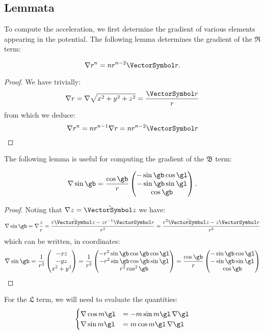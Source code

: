 \documentclass[10pt, a4paper, twoside]{basestyle}
\begin{document}
\subsection*{Lemmata}
To compute the acceleration, we first determine the gradient of various elements appearing in the potential.  The following lemma determines the gradient of the $\mathfrak R$ term:
\begin{lemma}
\[
\grad r^n = n r^{n - 2} \vr\text.
\]
\begin{proof}
We have trivially:
\[
\grad r = \grad \sqrt{x^2 + y^2 + z^2} = \frac{\vr}{r}
\]
from which we deduce:
\[
\grad r^n = n r^{n - 1} \grad r = n r^{n - 2} \vr
\]
\end{proof}
\end{lemma}
The following lemma is useful for computing the gradient of the $\mathfrak B$ term:
\begin{lemma}
\[
\grad \sin \gb =\frac{\cos \gb}{r}\begin{pmatrix}
-\sin \gb \cos \gl \\
-\sin \gb \sin \gl \\
\cos \gb
\end{pmatrix}\text.
\]
\begin{proof}
Noting that $\grad z = \hat{\vz}$ we have:
\[
\grad \sin \gb = \grad \frac{z}{r}
= \frac{r \hat{\vz} - z r^{-1} \vr}{r^2} = \frac{r^2 \hat{\vz} - z \vr}{r^3}
\]
which can be written, in coordinates:
\[
\grad \sin \gb =\frac{1}{r^3}\begin{pmatrix}
-x z \\ -y z \\ x^2 + y^2
\end{pmatrix}
=\frac{1}{r^3}\begin{pmatrix}
-r^2 \sin \gb \cos \gb \cos \gl \\
-r^2 \sin \gb \cos \gb \sin \gl \\
r^2 \cos^2 \gb
\end{pmatrix}
=\frac{\cos \gb}{r}\begin{pmatrix}
-\sin \gb \cos \gl \\
-\sin \gb \sin \gl \\
\cos \gb
\end{pmatrix}
\]
\end{proof}
\end{lemma}
For the $\mathfrak L$ term, we will need to evaluate the quantities:
\[
\begin{cases}
\grad \cos m \gl &= -m \sin m \gl \, \grad \gl \\
\grad \sin m \gl &= m \cos m \gl \, \grad \gl
\end{cases}
\]
\end{document}
